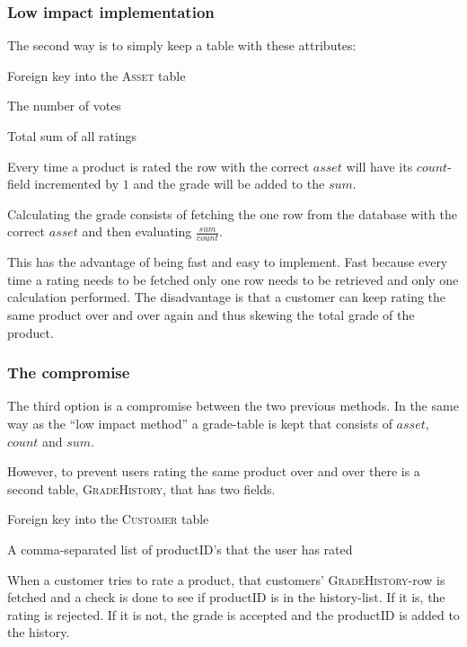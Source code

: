\documentclass[12pt, a4paper,titlepage]{article}
\begin{document}
\subsubsection{Low impact implementation}
The second way is to simply keep a table with these attributes:
\begin{description}
\setlength\itemsep{-7pt}
\item[asset] Foreign key into the \textsc{Asset} table
\item[count] The number of votes
\item[sum] Total sum of all ratings
\end{description}
Every time a product is rated the row with the correct $asset$ will have its
$count$-field incremented by $1$ and the grade will be added to the $sum$. 

Calculating the grade consists of fetching the one row from the database
with the correct $asset$ and then evaluating $\frac{sum}{count}$.

This has the advantage of being fast and easy to implement. Fast because every
time a rating needs to be fetched only one row needs to be retrieved and only
one calculation performed.
The disadvantage is that a customer can keep rating the same product over and
over again and thus skewing the total grade of the product.

\subsubsection{The compromise}
The third option is a compromise between the two previous methods.
In the same way as the ``low impact method'' a grade-table is kept that
consists of $asset$, $count$ and $sum$.

However, to prevent users rating the same product over and over there is a
second table, \textsc{GradeHistory}, that has two fields.
\begin{description}
\setlength\itemsep{-7pt}
\item[customer] Foreign key into the \textsc{Customer} table
\item[history] A comma-separated list of productID's that the user has rated
\end{description}
When a customer tries to rate a product, that customers' 
\textsc{GradeHistory}-row is fetched and a check is done to see if productID is
in the history-list. If it is, the rating is rejected. If it is not, the grade is
accepted and the productID is added to the history.
\end{document}
